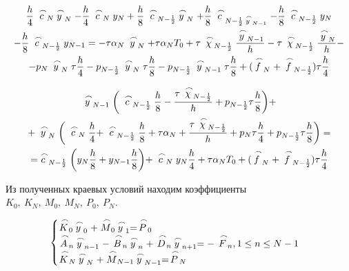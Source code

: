 \documentclass[a4paper, 14pt]{article}
\begin{document}
\begin{multline*}
\frac{h}{4}\buildrel\,\,\frown\over{c}_{N}\buildrel\,\,\frown\over{y}_N - 
\frac{h}{4}\buildrel\,\,\frown\over{c}_{N}y_N+
 \frac{h}{8}\buildrel\,\,\frown\over{c}_{N-\frac{1}{2}}\buildrel\,\,\frown\over{y}_{N} + 
\frac{h}{8}\buildrel\,\,\frown\over{c}_{N-\frac{1}{2}\buildrel\,\,\frown\over{y}_{N-1}} - 
\frac{h}{8}\buildrel\,\,\frown\over{c}_{N-\frac{1}{2}}{y}_{N}\-\\
-\frac{h}{8}\buildrel\,\,\frown\over{c}_{N-\frac{1}{2}}{y}_{N-1} = 
-\tau\alpha_N\buildrel\,\,\frown\over{y}_N+\tau\alpha_NT_0 +
\tau\buildrel\,\,\frown\over{\chi}_{N-\frac{1}{2}}\frac{\buildrel\,\,\frown\over{y}_{N-1}}{h} - 
\tau\buildrel\,\,\frown\over{\chi}_{N-\frac{1}{2}}\frac{\buildrel\,\,\frown\over{y}_{N}}{h}-\\
-p_N\buildrel\,\,\frown\over{y}_N\tau\frac{h}{4} - 
p_{N-\frac{1}{2}}\buildrel\,\,\frown\over{y}_{N}\tau\frac{h}{8} - 
p_{N-\frac{1}{2}}\buildrel\,\,\frown\over{y}_{N-1}\tau\frac{h}{8} +
(\buildrel\,\,\frown\over{f}_N+\buildrel\,\,\frown\over{f}_{N-\frac{1}{2}})\tau \frac{h}{4}
\end{multline*}

\begin{multline}
\buildrel\,\,\frown\over{y}_{N-1}\bigg(\buildrel\,\,\frown\over{c}_{N-\frac{1}{2}}\frac{h}{8}  - 
\frac{\tau\buildrel\,\,\frown\over{\chi}_{N-\frac{1}{2}}}{h} + 
p_{N-\frac{1}{2}}\tau\frac{h}{8}  \bigg)+\\
+ \buildrel\,\,\frown\over{y}_N\bigg( \buildrel\,\,\frown\over{c}_{N}\frac{h}{4} + 
\buildrel\,\,\frown\over{c}_{N-\frac{1}{2}}\frac{h}{8} + 
\tau\alpha_N +
\frac{ \tau\buildrel\,\,\frown\over{\chi}_{N-\frac{1}{2}}}{h} +
p_N\tau\frac{h}{4}+p_{N-\frac{1}{2}}\tau\frac{h}{8} \bigg)=\\
=\buildrel\,\,\frown\over{c}_{N-\frac{1}{2}}\bigg({y}_{N}\frac{h}{8} +
{y}_{N-1}\frac{h}{8} \bigg) +
\buildrel\,\,\frown\over{c}_{N}y_N\frac{h}{4} +
\tau\alpha_NT_0 +
(\buildrel\,\,\frown\over{f}_N +
\buildrel\,\,\frown\over{f}_{N-\frac{1}{2}})\tau \frac{h}{4}
\end{multline}

Из полученных краевых условий находим коэффициенты $K_0,~K_N,~M_0,~M_N,~P_0,~P_N$. 


\begin{equation}
\begin{cases}
\buildrel\,\,\frown\over{K}_0\buildrel\,\,\frown\over{y}_0+\buildrel\,\,\frown\over{M}_0\buildrel\,\,\frown\over{y}_1=\buildrel\,\,\frown\over{P}_0\\
\buildrel\,\,\frown\over{A}_n\buildrel\,\,\frown\over{y}_{n-1}-\buildrel\,\,\frown\over{B}_n\buildrel\,\,\frown\over{y}_n+\buildrel\,\,\frown\over{D}_n\buildrel\,\,\frown\over{y}_{n+1}=-\buildrel\,\,\frown\over{F}_n, 1\le n\le N-1\\
\buildrel\,\,\frown\over{K}_N\buildrel\,\,\frown\over{y}_N+\buildrel\,\,\frown\over{M}_{N-1}\buildrel\,\,\frown\over{y}_{N-1}=\buildrel\,\,\frown\over{P}_N\\
\end{cases}
\end{equation}
\end{document}
